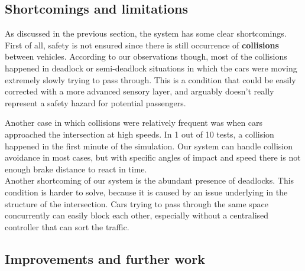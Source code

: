 \iffalse
\begin{itemize}
\item Discuss experimental results. ~
\item Shortcomings of model.
\item Improvements for further tests.
\item traffic fairness - distribution
\end{itemize}
\fi

\subsection{Shortcomings and limitations}
 
As discussed in the previous section, the system has some clear shortcomings.
First of all, safety is not ensured since there is still occurrence of \textbf{collisions} between vehicles.
According to our observations though, most of the collisions happened in deadlock or semi-deadlock situations in which the cars were moving extremely slowly trying to pass through.
This is a condition that could be easily corrected with a more advanced sensory layer, and arguably doesn't really represent a safety hazard for potential passengers.

Another case in which collisions were relatively frequent was when cars approached the intersection at high speeds.
In 1 out of 10 tests, a collision happened in the first minute of the simulation.
Our system can handle collision avoidance in most cases, but with specific angles of impact and speed there is not enough brake distance to react in time.\\

Another shortcoming of our system is the abundant presence of deadlocks.
This condition is harder to solve, because it is caused by an issue underlying in the structure of the intersection.
Cars trying to pass through the same space concurrently can easily block each other, especially without a centralised controller that can sort the traffic.

\subsection{Improvements and further work}

